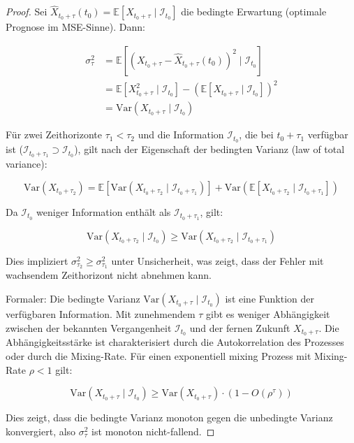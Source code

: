 \documentclass[a4paper, 12pt, twoside, openright]{report}
\theoremstyle{definition}
\theoremstyle{definition}
\newcommand{\E}{\mathbb{E}}
\newcommand{\Var}{\mathrm{Var}}
\begin{document}
\begin{proof}
Sei $\hat{X}_{t_0+\tau}(t_0) = \E[X_{t_0+\tau} \mid \mathcal{I}_{t_0}]$ die bedingte Erwartung (optimale Prognose im MSE-Sinne). Dann:

\begin{align}
\sigma_\tau^2 &= \E\left[ \left( X_{t_0+\tau} - \hat{X}_{t_0+\tau}(t_0) \right)^2 \mid \mathcal{I}_{t_0} \right] \\
&= \E\left[ X_{t_0+\tau}^2 \mid \mathcal{I}_{t_0} \right] - \left( \E[X_{t_0+\tau} \mid \mathcal{I}_{t_0}] \right)^2 \\
&= \Var(X_{t_0+\tau} \mid \mathcal{I}_{t_0})
\end{align}

Für zwei Zeithorizonte $\tau_1 < \tau_2$ und die Information $\mathcal{I}_{t_0}$, die bei $t_0 + \tau_1$ verfügbar ist ($\mathcal{I}_{t_0+\tau_1} \supset \mathcal{I}_{t_0}$), gilt nach der Eigenschaft der bedingten Varianz (law of total variance):

\begin{equation}
\Var(X_{t_0+\tau_2}) = \E[\Var(X_{t_0+\tau_2} \mid \mathcal{I}_{t_0+\tau_1})] + \Var(\E[X_{t_0+\tau_2} \mid \mathcal{I}_{t_0+\tau_1}])
\end{equation}

Da $\mathcal{I}_{t_0}$ weniger Information enthält als $\mathcal{I}_{t_0+\tau_1}$, gilt:

\begin{equation}
\Var(X_{t_0+\tau_2} \mid \mathcal{I}_{t_0}) \geq \Var(X_{t_0+\tau_2} \mid \mathcal{I}_{t_0+\tau_1})
\end{equation}

Dies impliziert $\sigma_{\tau_2}^2 \geq \sigma_{\tau_1}^2$ unter Unsicherheit, was zeigt, dass der Fehler mit wachsendem Zeithorizont nicht abnehmen kann.

Formaler: Die bedingte Varianz $\Var(X_{t_0+\tau} \mid \mathcal{I}_{t_0})$ ist eine Funktion der verfügbaren Information. Mit zunehmendem $\tau$ gibt es weniger Abhängigkeit zwischen der bekannten Vergangenheit $\mathcal{I}_{t_0}$ und der fernen Zukunft $X_{t_0+\tau}$. Die Abhängigkeitsstärke ist charakterisiert durch die Autokorrelation des Prozesses oder durch die Mixing-Rate. Für einen exponentiell mixing Prozess mit Mixing-Rate $\rho < 1$ gilt:

\begin{equation}
\Var(X_{t_0+\tau} \mid \mathcal{I}_{t_0}) \geq \Var(X_{t_0+\tau}) \cdot (1 - O(\rho^\tau))
\end{equation}

Dies zeigt, dass die bedingte Varianz monoton gegen die unbedingte Varianz konvergiert, also $\sigma_\tau^2$ ist monoton nicht-fallend.
\end{proof}
\end{document}

